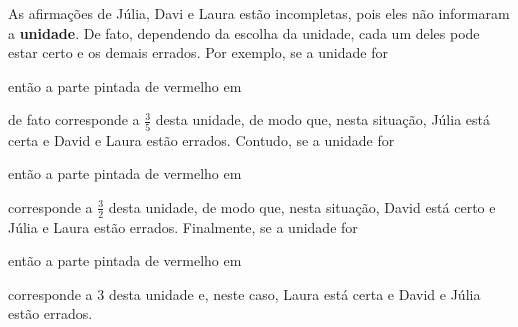 \begin{multicols}{2}
\begin{solucao}{}{}
  As afirmações de Júlia, Davi e Laura estão incompletas, pois eles não informaram a   {\bf unidade}. De fato, dependendo da escolha da unidade, cada um deles pode estar certo e os demais errados. Por exemplo, se a unidade for
\begin{center}
\end{center}
então a parte pintada de vermelho em
\begin{center}
\end{center}
de fato corresponde a   $\frac{3}{5}$ desta unidade, de modo que, nesta situação, Júlia está certa e David e Laura estão errados. Contudo, se a unidade for
\begin{center}
\end{center}
então a parte pintada de vermelho em
\begin{center}
\end{center}
  corresponde a   $\frac{3}{2}$ desta unidade,  de modo que, nesta situação, David está certo e Júlia e Laura estão errados. Finalmente, se a unidade for
\begin{center}
\end{center}
então a parte pintada de vermelho em
\begin{center}
\end{center}
  corresponde a   $3$ desta unidade e, neste caso, Laura está certa e David e Júlia estão errados.
\end{solucao}



\end{multicols}
